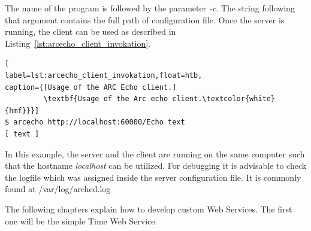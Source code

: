 %
%
The name of the program is followed by the parameter \textit{-c}.
The string following that argument contains the full path of configuration file.
Once the server is running, the client can be used as described in Listing~\ref{lst:arcecho_client_invokation}.
\begin{lstlisting}[
label=lst:arcecho_client_invokation,float=htb,
caption={[Usage of the ARC Echo client.]
         \textbf{Usage of the Arc echo client.\textcolor{white}{hmf}}}]
$ arcecho http://localhost:60000/Echo text
[ text ]
\end{lstlisting}

In this example, the server and the client are running on the same computer such that the hostname \textit{localhost} can be utilized. 
For debugging it is advisable to check the logfile which was assigned inside the server configuration file.
It is commonly found at /var/log/arched.log

The following chapters explain how to develop custom Web Services.
The first one will be the simple Time Web Service.












